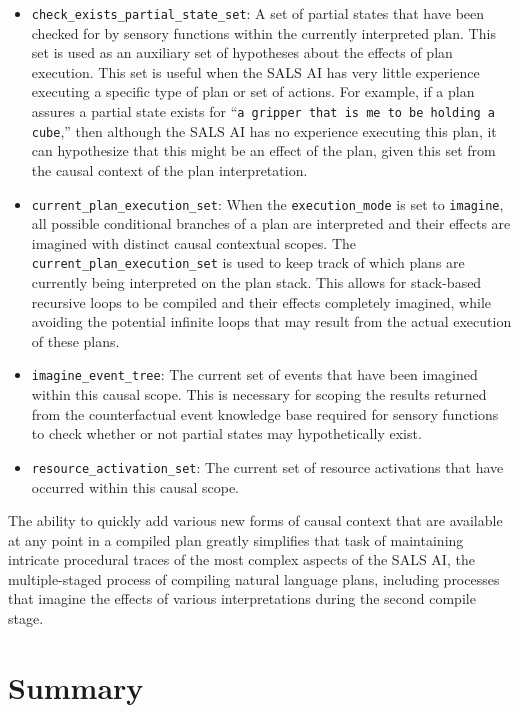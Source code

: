 \begin{itemize}
\item {\tt{check\_exists\_partial\_state\_set}}: A set of partial
  states that have been checked for by sensory functions within the
  currently interpreted plan.  This set is used as an auxiliary set of
  hypotheses about the effects of plan execution.  This set is useful
  when the SALS AI has very little experience executing a specific
  type of plan or set of actions.  For example, if a plan assures a
  partial state exists for ``{\tt{a gripper that is me to be holding a
      cube}},'' then although the SALS AI has no experience executing
  this plan, it can hypothesize that this might be an effect of the
  plan, given this set from the causal context of the plan
  interpretation.
\item {\tt{current\_plan\_execution\_set}}: When the
  {\tt{execution\_mode}} is set to {\tt{imagine}}, all possible
  conditional branches of a plan are interpreted and their effects are
  imagined with distinct causal contextual scopes.  The
  {\tt{current\_plan\_execution\_set}} is used to keep track of which
  plans are currently being interpreted on the plan stack.  This
  allows for stack-based recursive loops to be compiled and their
  effects completely imagined, while avoiding the potential infinite
  loops that may result from the actual execution of these plans.
\item {\tt{imagine\_event\_tree}}: The current set of events that have
  been imagined within this causal scope.  This is necessary for
  scoping the results returned from the counterfactual event knowledge
  base required for sensory functions to check whether or not partial
  states may hypothetically exist.
\item {\tt{resource\_activation\_set}}: The current set of resource
  activations that have occurred within this causal scope.
\end{itemize}
The ability to quickly add various new forms of causal context that
are available at any point in a compiled plan greatly simplifies that
task of maintaining intricate procedural traces of the most complex
aspects of the SALS AI, the multiple-staged process of compiling
natural language plans, including processes that imagine the effects
of various interpretations during the second compile stage.

\section{Summary}

